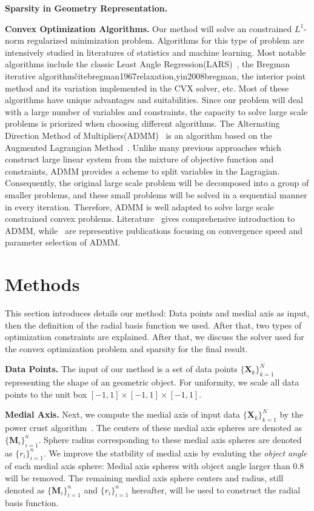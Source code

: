 \documentclass[review]{acmsiggraph}
\begin{document}
\textbf{Sparsity in Geometry Representation. } 

\textbf{Convex Optimization Algorithms. }
Our method will solve an constrained $L^1$-norm regularized minimization problem. Algorithms for this type of problem are intensively studied in literatures of statistics and machine learning. Most notable algorithms include the classic Least Angle Regression(LARS)~\cite{efron2004least}, the Bregman iterative algorithm\~cite{bregman1967relaxation,yin2008bregman}, the interior point method and its variation implemented in the CVX solver\cite{grant2008cvx}, etc. Most of these algorithms have unique advantages and suitabilities. Since our problem will deal with a large number of variables and constraints, the capacity to solve large scale problems is priorized when choosing different algorithms. The Alternating Direction Method of Multipliers(ADMM)~\cite{boyd2011distributed} is an algorithm based on the Augmented Lagrangian Method~\cite{nocedal2006conjugate}. Unlike many previous approaches which construct large linear system from the mixture of objective function and constraints, ADMM provides a scheme to split variables in the Lagragian. Consequently, the original large scale problem will be decomposed into a group of smaller problems, and these small problems will be solved in a sequential manner in every iteration. Therefore, ADMM is well adapted to solve large scale constrained convex problems. Literature~\cite{boyd2011distributed,} gives comprehensive introduction to ADMM, while~\cite{eckstein1998operator,he2000alternating,wang2001decomposition} are representive publications focusing on convergence speed and parameter selection of ADMM.

\section{Methods}

This section introduces details our method: Data points and medial axis as input, then the definition of the radial basis function we used. After that, two types of optimization constraints are explained. After that, we discuss the solver used for the convex optimization problem and sparsity for the final result.

\textbf{Data Points. }
The input of our method is a set of data points $\{\mathbf{X}_k\}_{k=1}^N$ representing the shape of an geometric object. For uniformity, we scale all data points to the unit box $[-1,1]\times[-1,1]\times[-1,1]$. 

\textbf{Medial Axis. }
Next, we compute the medial axis of input data $\{\mathbf{X}_k\}_{k=1}^N$ by the power crust algorithm~\cite{amenta2001medial}. The centers of these medial axis spheres are denoted as $\{\mathbf{M}_i\}_{i=1}^n$. Sphere radius corresponding to these medial axis spheres are denoted as $\{r_i\}_{i=1}^n$. We improve the statbility of medial axis by evaluting the \textit{object angle} of each medial axis sphere: Medial axis spheres with object angle larger than 0.8 will be removed. The remaining medial axis sphere centers and radius, still denoted as $\{\mathbf{M}_i\}_{i=1}^n$ and $\{r_i\}_{i=1}^n$ hereafter, will be used to construct the radial basis function.
\end{document}
